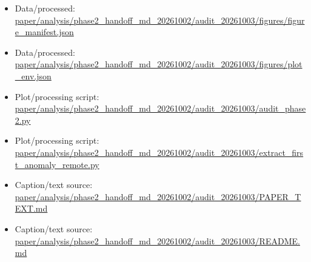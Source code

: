 \begin{itemize}[leftmargin=1.4em,noitemsep]
\item Data/processed: \begingroup\scriptsize\url{paper/analysis/phase2_handoff_md_20261002/audit_20261003/figures/figure_manifest.json}\endgroup
\item Data/processed: \begingroup\scriptsize\url{paper/analysis/phase2_handoff_md_20261002/audit_20261003/figures/plot_env.json}\endgroup
\item Plot/processing script: \begingroup\scriptsize\url{paper/analysis/phase2_handoff_md_20261002/audit_20261003/audit_phase2.py}\endgroup
\item Plot/processing script: \begingroup\scriptsize\url{paper/analysis/phase2_handoff_md_20261002/audit_20261003/extract_first_anomaly_remote.py}\endgroup
\item Caption/text source: \begingroup\scriptsize\url{paper/analysis/phase2_handoff_md_20261002/audit_20261003/PAPER_TEXT.md}\endgroup
\item Caption/text source: \begingroup\scriptsize\url{paper/analysis/phase2_handoff_md_20261002/audit_20261003/README.md}\endgroup
\end{itemize}

